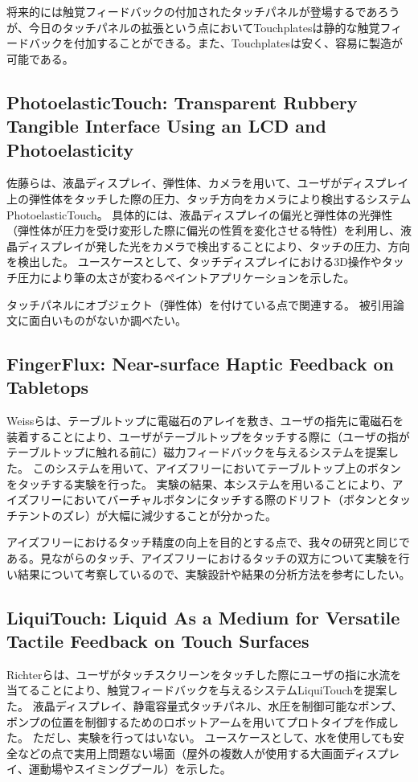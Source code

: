 \documentclass[11pt,a4paper]{jarticle}
\begin{document}
将来的には触覚フィードバックの付加されたタッチパネルが登場するであろうが、今日のタッチパネルの拡張という点においてTouchplatesは静的な触覚フィードバックを付加することができる。また、Touchplatesは安く、容易に製造が可能である。

\subsection{PhotoelasticTouch: Transparent Rubbery Tangible Interface Using an LCD and Photoelasticity\cite{Sato:2009}}
佐藤らは、液晶ディスプレイ、弾性体、カメラを用いて、ユーザがディスプレイ上の弾性体をタッチした際の圧力、タッチ方向をカメラにより検出するシステムPhotoelasticTouch。
具体的には、液晶ディスプレイの偏光と弾性体の光弾性（弾性体が圧力を受け変形した際に偏光の性質を変化させる特性）を利用し、液晶ディスプレイが発した光をカメラで検出することにより、タッチの圧力、方向を検出した。
ユースケースとして、タッチディスプレイにおける3D操作やタッチ圧力により筆の太さが変わるペイントアプリケーションを示した。

タッチパネルにオブジェクト（弾性体）を付けている点で関連する。
被引用論文に面白いものがないか調べたい。

\subsection{FingerFlux: Near-surface Haptic Feedback on Tabletops\cite{Weiss:2011}}
Weissらは、テーブルトップに電磁石のアレイを敷き、ユーザの指先に電磁石を装着することにより、ユーザがテーブルトップをタッチする際に（ユーザの指がテーブルトップに触れる前に）磁力フィードバックを与えるシステムを提案した。
このシステムを用いて、アイズフリーにおいてテーブルトップ上のボタンをタッチする実験を行った。
実験の結果、本システムを用いることにより、アイズフリーにおいてバーチャルボタンにタッチする際のドリフト（ボタンとタッチテントのズレ）が大幅に減少することが分かった。

アイズフリーにおけるタッチ精度の向上を目的とする点で、我々の研究と同じである。見ながらのタッチ、アイズフリーにおけるタッチの双方について実験を行い結果について考察しているので、実験設計や結果の分析方法を参考にしたい。

\subsection{LiquiTouch: Liquid As a Medium for Versatile Tactile Feedback on Touch Surfaces\cite{Richter:2013}}
Richterらは、ユーザがタッチスクリーンをタッチした際にユーザの指に水流を当てることにより、触覚フィードバックを与えるシステムLiquiTouchを提案した。
液晶ディスプレイ、静電容量式タッチパネル、水圧を制御可能なポンプ、ポンプの位置を制御するためのロボットアームを用いてプロトタイプを作成した。
ただし、実験を行ってはいない。
ユースケースとして、水を使用しても安全などの点で実用上問題ない場面（屋外の複数人が使用する大画面ディスプレイ、運動場やスイミングプール）を示した。
\end{document}
